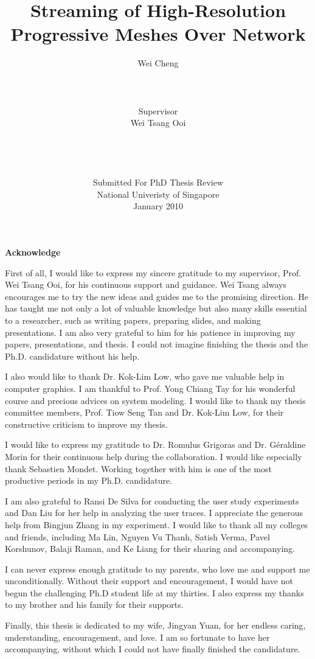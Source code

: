 \documentclass[11pt, a4paper]{report}
\title{Streaming of High-Resolution Progressive Meshes Over Network}
\author{Wei Cheng\\
\\
\\
\\
Supervisor\\
Wei Tsang Ooi
\\
\\
\\
\\
\\
Submitted For PhD Thesis Review\\
National Univeristy of Singapore\\
January 2010}
\newcommand\acknowledgename{Acknowledge}
\newenvironment{acknowledge}%
    {\cleardoublepage \null \vfill
    \begin{center}%
         \bfseries \acknowledgename
    \end{center}}%
    {\vfill \null}
\begin{document}
\maketitle
\doublespacing
{}
   
\begin{acknowledge}
    First of all, I would like to express my sincere gratitude to my supervisor, Prof. Wei Tsang Ooi, for his continuous support and guidance. 
    Wei Tsang always encourages me to try the new ideas and guides me to the promising direction. He has taught me not only a lot of valuable knowledge
    but also many skills essential to a researcher, such as writing papers, preparing slides, and making presentations. 
    I am also very grateful to him for his patience in improving my papers, presentations, and thesis. 
    I could not imagine finishing the thesis and the Ph.D. candidature without his help.

    I also would like to thank Dr. Kok-Lim Low, who gave me valuable help in computer graphics. I am thankful to Prof. Yong Chiang Tay for his
    wonderful course and precious advices on system modeling. I would like to thank my thesis committee members, Prof. Tiow Seng Tan and Dr. Kok-Lim Low, 
    for their constructive criticism to improve my thesis.

    I would like to express my gratitude to Dr. Romulus Grigoras and Dr. G\'{e}raldine Morin for their continuous help during the collaboration. I would
    like especially thank Sebastien Mondet. Working together with him is one of the most productive periods in my Ph.D. candidature. 

    I am also grateful to Ransi De Silva for conducting the user study experiments and Dan Liu for her help in analyzing the user traces.
    I appreciate the generous help from Bingjun Zhang in my experiment. 
    I would like to thank all my colleges and friends, including Ma Lin, Nguyen Vu Thanh, Satish Verma, Pavel Korshunov, Balaji Raman, and Ke Liang for their
    sharing and accompanying.

    I can never express enough gratitude to my parents, who love me and support me unconditionally. Without their support and encouragement, I would have not
    begun the challenging Ph.D student life at my thirties. I also express my thanks to my brother and his family for their supports. 
    
    Finally, this thesis is dedicated to my wife, Jingyan Yuan, for her endless caring, understanding, encouragement, and love. I am so fortunate to have her
    accompanying, without which I could not have finally finished the candidature.

\end{acknowledge}
\tableofcontents
\listoffigures
\listoftables







\appendix
\end{document}
